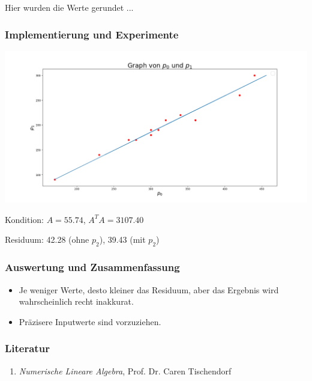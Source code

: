 \documentclass{beamer}
\begin{document}
\begin{frame}
Hier wurden die Werte gerundet ...

\frametitle{Implementierung und Experimente}
\includegraphics[width=\textwidth]{plot2.png}

Kondition: $A = 55.74$, $A^T A = 3107.40$

Residuum: 42.28 (ohne $p_2$), 39.43 (mit $p_2$)
\end{frame}


\begin{frame}
\frametitle{Auswertung und Zusammenfassung}

\begin{itemize}


\item Je weniger Werte, desto kleiner das Residuum, aber das Ergebnis wird wahrscheinlich recht inakkurat.
\item Präzisere Inputwerte sind vorzuziehen.
\end{itemize}

\end{frame}

\begin{frame}
\frametitle{Literatur}
\begin{enumerate}

\item \textit{Numerische Lineare Algebra}, Prof. Dr. Caren Tischendorf

\end{enumerate}

\end{frame}
\end{document}
